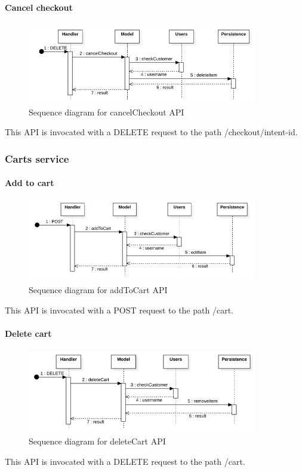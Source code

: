 \paragraph*{Cancel checkout}
\begin{figure}[H]
    \includegraphics[width=0.9\textwidth]{res/images/sequence-diagrams/orders/cancelCheckout.png}
    \caption{Sequence diagram for cancelCheckout API}
\end{figure}
This API is invocated with a DELETE request to the path /checkout/{intent-id}.

\subsubsection{Carts service}
\paragraph*{Add to cart}
\begin{figure}[H]
    \includegraphics[width=0.9\textwidth]{res/images/sequence-diagrams/carts/addToCart.png}
    \caption{Sequence diagram for addToCart API}
\end{figure}
This API is invocated with a POST request to the path /cart.

\paragraph*{Delete cart}
\begin{figure}[H]
    \includegraphics[width=0.9\textwidth]{res/images/sequence-diagrams/carts/deleteCart.png}
    \caption{Sequence diagram for deleteCart API}
\end{figure}
This API is invocated with a DELETE request to the path /cart.

